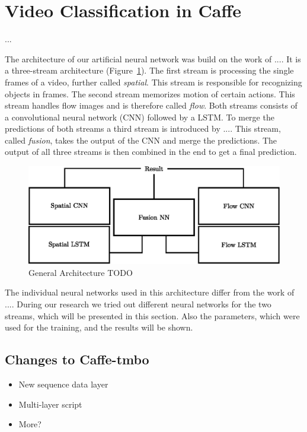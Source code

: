 \section{Video Classification in Caffe}
\label{sec:classification}

...

The architecture of our artificial neural network was build on the work of ....
It is a three-stream architecture (Figure~\ref{fig:architecture}).
The first stream is processing the single frames of a video, further called \emph{spatial}.
This stream is responsible for recognizing objects in frames.
The second stream memorizes motion of certain actions.
This stream handles flow images and is therefore called \emph{flow}.
Both streams consists of a convolutional neural network (CNN) followed by a LSTM.
To merge the predictions of both streams a third stream is introduced by ....
This stream, called \emph{fusion}, takes the output of the CNN and merge the predictions.
The output of all three streams is then combined in the end to get a final prediction.
\begin{figure}[!htb]
	\centering
	\includegraphics[scale=.7]{images/architecture.eps}
	\caption{General Architecture TODO}
	\label{fig:architecture}
\end{figure}

The individual neural networks used in this architecture differ from the work of ....
During our research we tried out different neural networks for the two streams, which will be presented in this section.
Also the parameters, which were used for the training, and the results will be shown.

\subsection{Changes to Caffe-tmbo}

\begin{itemize}
	\item New sequence data layer
	\item Multi-layer script
	\item More?
\end{itemize}


